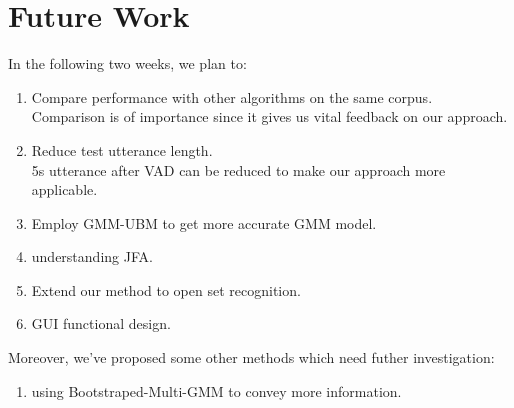 \section{Future Work}
In the following two weeks, we plan to:

\begin{enumerate}
	\item Compare performance with other algorithms on the same corpus.\\
		Comparison is of importance since it gives us vital feedback on our approach.
	\item Reduce test utterance length. \\
		5s utterance after VAD can be reduced to make our approach more applicable.
	\item Employ GMM-UBM to get more accurate GMM model.
	\item understanding JFA.
	\item Extend our method to open set recognition.
	\item GUI functional design.
\end{enumerate}

Moreover, we've proposed some other methods which need futher investigation:
\begin{enumerate}
	\item using Bootstraped-Multi-GMM to convey more information.
\end{enumerate}
